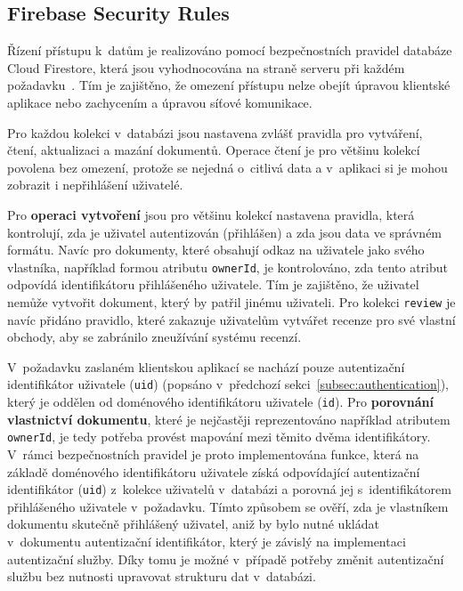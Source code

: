 \subsection{Firebase Security Rules}
Řízení přístupu k~datům je realizováno pomocí bezpečnostních pravidel databáze Cloud Firestore, která jsou vyhodnocována na straně serveru při každém požadavku~\parencite{firebase_security_rules}.
Tím je zajištěno, že omezení přístupu nelze obejít úpravou klientské aplikace nebo zachycením a úpravou síťové komunikace.

Pro každou kolekci v~databázi jsou nastavena zvlášť pravidla pro vytváření, čtení, aktualizaci a mazání dokumentů.
Operace čtení je pro většinu kolekcí povolena bez omezení, protože se nejedná o~citlivá data a v~aplikaci si je mohou zobrazit i nepřihlášení uživatelé.

Pro \textbf{operaci vytvoření} jsou pro většinu kolekcí nastavena pravidla, která kontrolují, zda je uživatel autentizován (přihlášen) a zda jsou data ve správném formátu.
Navíc pro dokumenty, které obsahují odkaz na uživatele jako svého vlastníka, například formou atributu \texttt{owner\-Id}, je kontrolováno, zda tento atribut odpovídá identifikátoru přihlášeného uživatele.
Tím je zajištěno, že uživatel nemůže vytvořit dokument, který by patřil jinému uživateli.
Pro kolekci \texttt{review} je navíc přidáno pravidlo, které zakazuje uživatelům vytvářet recenze pro své vlastní obchody, aby se zabránilo zneužívání systému recenzí.

V~požadavku zaslaném klientskou aplikací se nachází pouze autentizační identifikátor uživatele (\texttt{uid}) (popsáno v~předchozí sekci~\ref{subsec:authentication}), který je oddělen od doménového identifikátoru uživatele (\texttt{id}).
Pro \textbf{porovnání vlastnictví dokumentu}, které je nejčastěji reprezentováno například atributem \texttt{owner\-Id}, je tedy potřeba provést mapování mezi těmito dvěma identifikátory.
V~rámci bezpečnostních pravidel je proto implementována funkce, která na základě doménového identifikátoru uživatele získá odpovídající autentizační identifikátor (\texttt{uid}) z~kolekce uživatelů v~databázi a porovná jej s~identifikátorem přihlášeného uživatele v~požadavku.
Tímto způsobem se ověří, zda je vlastníkem dokumentu skutečně přihlášený uživatel, aniž by bylo nutné ukládat v~dokumentu autentizační identifikátor, který je závislý na implementaci autentizační služby.
Díky tomu je možné v~případě potřeby změnit autentizační službu bez nutnosti upravovat strukturu dat v~databázi.

